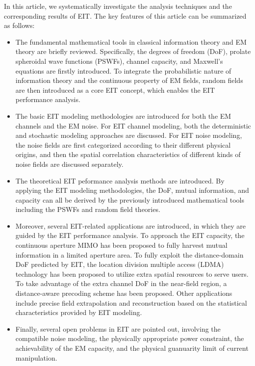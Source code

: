 \documentclass[journal,twocolumn]{IEEEtran}
\begin{document}
In this article, we systematically investigate the analysis techniques and the corresponding results of EIT. The key features of this article can be summarized as follows:
\begin{itemize}
\item{The fundamental mathematical tools in classical information theory and EM theory are briefly reviewed. Specifically, the degrees of freedom (DoF), prolate spheroidal wave functions (PSWFs), channel capacity, and Maxwell's equations are firstly introduced. To integrate the probabilistic nature of information theory and the continuous property of EM fields, random fields are then introduced as a core EIT concept, which enables the EIT performance analysis. }
\item{The basic EIT modeling methodologies are introduced for both the EM channels and the EM noise. For EIT channel modeling, both the deterministic and stochastic modeling approaches are discussed. For EIT noise modeling, the noise fields are first categorized according to their different physical origins, and then the spatial correlation characteristics of different kinds of noise fields are discussed separately. }
\item{The theoretical EIT peformance analysis methods are introduced. By applying the EIT modeling methodologies, the DoF, mutual information, and capacity can all be derived by the previously introduced mathematical tools including the PSWFs and random field theories. } 
\item{Moreover, several EIT-related applications are introduced, in which they are guided by the EIT performance analysis. To approach the EIT capacity, the continuous aperture MIMO has been proposed to fully harvest mutual information in a limited aperture area. To fully exploit the distance-domain DoF predicted by EIT, the location division multiple access (LDMA) technology has been proposed to utilize extra spatial resources to serve users. To take advantage of the extra channel DoF in the near-field region, a distance-aware precoding scheme has been proposed. Other applications include precise field extrapolation and reconstruction based on the statistical characteristics provided by EIT modeling. }
\item{Finally, several open problems in EIT are pointed out, involving the compatible noise modeling, the physically appropriate power constraint, the achievability of the EM capacity, and the physical guanuarity limit of current manipulation.}
\end{itemize}
\end{document}
